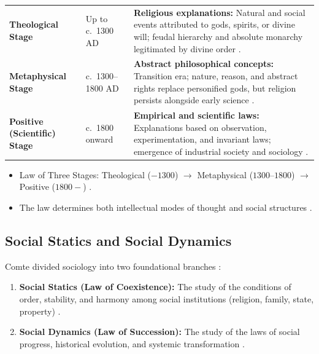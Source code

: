 \vspace{6pt}
\noindent
\begin{tabularx}{\textwidth}{p{3.2cm} p{3.2cm} Y}
\toprule
{}
 &  &  \\
\midrule
\textbf{Theological Stage} & Up to c.~1300 AD & \textbf{Religious explanations:} Natural and social events attributed to gods, spirits, or divine will; feudal hierarchy and absolute monarchy legitimated by divine order . \\
\textbf{Metaphysical Stage} & c.~1300--1800 AD & \textbf{Abstract philosophical concepts:} Transition era; nature, reason, and abstract rights replace personified gods, but religion persists alongside early science . \\
\textbf{Positive (Scientific) Stage} & c.~1800 onward & \textbf{Empirical and scientific laws:} Explanations based on observation, experimentation, and invariant laws; emergence of industrial society and sociology . \\
\bottomrule
\end{tabularx}
\vspace{6pt}

\begin{QuickRevision}
\begin{itemize}
    \item Law of Three Stages: Theological ($-\text{1300}$) $\rightarrow$ Metaphysical ($1300\text{--}1800$) $\rightarrow$ Positive ($1800-$) .
    \item The law determines both intellectual modes of thought and social structures .
\end{itemize}
\end{QuickRevision}

\subsection{Social Statics and Social Dynamics}
Comte divided sociology into two foundational branches :
\begin{enumerate}
    \item \textbf{Social Statics (Law of Coexistence):} The study of the conditions of order, stability, and harmony among social institutions (religion, family, state, property) .
    \item \textbf{Social Dynamics (Law of Succession):} The study of the laws of social progress, historical evolution, and systemic transformation .
\end{enumerate}

